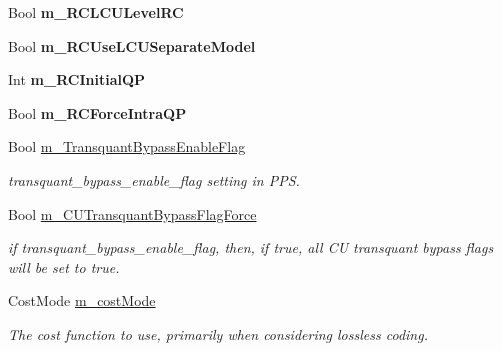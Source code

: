 \begin{DoxyCompactItemize}
\mbox{\label{class_t_enc_cfg_aeb33e30913291228938d61143e76e668}} 
Bool {\bfseries m\+\_\+\+R\+C\+L\+C\+U\+Level\+RC}
\item 
\mbox{\label{class_t_enc_cfg_a06bda7d448b3427e4bc2e0f11cc24fb6}} 
Bool {\bfseries m\+\_\+\+R\+C\+Use\+L\+C\+U\+Separate\+Model}
\item 
\mbox{\label{class_t_enc_cfg_a0a1bb0562ca70e81e5c32d75bc0d44ad}} 
Int {\bfseries m\+\_\+\+R\+C\+Initial\+QP}
\item 
\mbox{\label{class_t_enc_cfg_a60bc044159adef033d5599a9a1dddb93}} 
Bool {\bfseries m\+\_\+\+R\+C\+Force\+Intra\+QP}
\item 
\mbox{\label{class_t_enc_cfg_a1212e87d8060b9cc661a5d492826b8d1}} 
Bool \hyperlink{class_t_enc_cfg_a1212e87d8060b9cc661a5d492826b8d1}{m\+\_\+\+Transquant\+Bypass\+Enable\+Flag}
\begin{DoxyCompactList}\small\item\em transquant\+\_\+bypass\+\_\+enable\+\_\+flag setting in P\+PS. \end{DoxyCompactList}\item 
\mbox{\label{class_t_enc_cfg_a18a596a5b7dbf04dcf503be47c3da389}} 
Bool \hyperlink{class_t_enc_cfg_a18a596a5b7dbf04dcf503be47c3da389}{m\+\_\+\+C\+U\+Transquant\+Bypass\+Flag\+Force}
\begin{DoxyCompactList}\small\item\em if transquant\+\_\+bypass\+\_\+enable\+\_\+flag, then, if true, all CU transquant bypass flags will be set to true. \end{DoxyCompactList}\item 
\mbox{\label{class_t_enc_cfg_a61957518c1d9d9ee0ce828c8973ad4ea}} 
Cost\+Mode \hyperlink{class_t_enc_cfg_a61957518c1d9d9ee0ce828c8973ad4ea}{m\+\_\+cost\+Mode}
\begin{DoxyCompactList}\small\item\em The cost function to use, primarily when considering lossless coding. \end{DoxyCompactList}\item 
\mbox{\label{class_t_enc_cfg_a1ee8b2a5015bc5609280f63080fa3630}} 

\end{DoxyCompactItemize}
